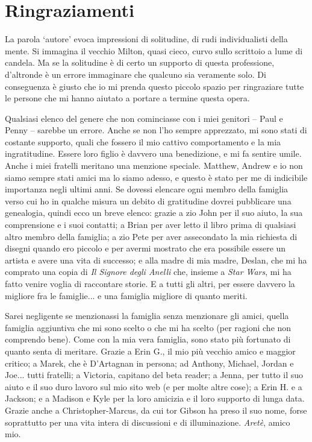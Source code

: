 \chapter{Ringraziamenti}

La parola `autore' evoca impressioni di solitudine, di rudi
individualisti della mente. Si immagina il vecchio Milton, quasi cieco,
curvo sullo scrittoio a lume di candela. Ma se la solitudine è di certo
un supporto di questa professione, d'altronde è un errore immaginare che
qualcuno sia veramente solo. Di conseguenza è giusto che io mi prenda
questo piccolo spazio per ringraziare tutte le persone che mi hanno
aiutato a portare a termine questa opera.

Qualsiasi elenco del genere che non cominciasse con i miei genitori --
Paul e Penny -- sarebbe un errore. Anche se non l'ho sempre apprezzato,
mi sono stati di costante supporto, quali che fossero il mio cattivo
comportamento e la mia ingratitudine. Essere loro figlio è davvero una
benedizione, e mi fa sentire umile. Anche i miei fratelli meritano una
menzione speciale. Matthew, Andrew e io non siamo sempre stati amici ma
lo siamo adesso, e questo è stato per me di indicibile importanza negli
ultimi anni. Se dovessi elencare ogni membro della famiglia verso cui ho
in qualche misura un debito di gratitudine dovrei pubblicare una
genealogia, quindi ecco un breve elenco: grazie a zio John per il suo
aiuto, la sua comprensione e i suoi contatti; a Brian per aver letto il
libro prima di qualsiasi altro membro della famiglia; a zio Pete per
aver assecondato la mia richiesta di disegni quando ero piccolo e per
avermi mostrato che era possibile essere un artista e avere una vita di
successo; e alla madre di mia madre, Deslan, che mi ha comprato una
copia di \emph{Il Signore degli Anelli} che, insieme a \emph{Star Wars},
\emph{} mi ha fatto venire voglia di raccontare storie. E a tutti gli
altri, per essere davvero la migliore fra le famiglie... e una famiglia
migliore di quanto meriti.

Sarei negligente se menzionassi la famiglia senza menzionare gli amici,
quella famiglia aggiuntiva che mi sono scelto o che mi ha scelto (per
ragioni che non comprendo bene). Come con la mia vera famiglia, sono
stato più fortunato di quanto senta di meritare. Grazie a Erin G., il
mio più vecchio amico e maggior critico; a Marek, che è D'Artagnan in
persona; ad Anthony, Michael, Jordan e Joe... tutti fratelli; a
Victoria, capitano del beta reader; a Jenna, per tutto il suo aiuto e il
suo duro lavoro sul mio sito web (e per molte altre cose); a Erin H. e a
Jackson; e a Madison e Kyle per la loro amicizia e il loro supporto di
lunga data. Grazie anche a Christopher-Marcus, da cui tor Gibson ha
preso il suo nome, forse soprattutto per una vita intera di discussioni
e di illuminazione. \emph{Aretè}, amico mio.


